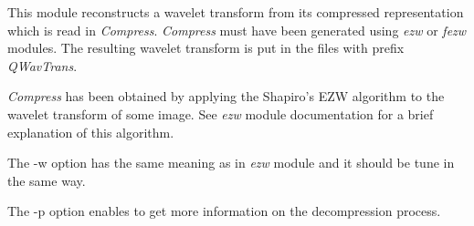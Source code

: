 This module reconstructs a wavelet transform from its compressed representation 
which is read in {\em Compress}. {\em Compress} must have been generated 
using {\em ezw} or {\em fezw} modules. The resulting wavelet transform is 
put in the files with prefix {\em QWavTrans}. 

{\em Compress} has been obtained by applying the Shapiro's EZW algorithm to 
the wavelet transform of some image. See {\em ezw} module documentation 
for a brief explanation of this algorithm. 

The -w option has the same meaning as in {\em ezw} module and it 
should be tune in the same way. 

The -p option enables to get more information on the decompression process. 

